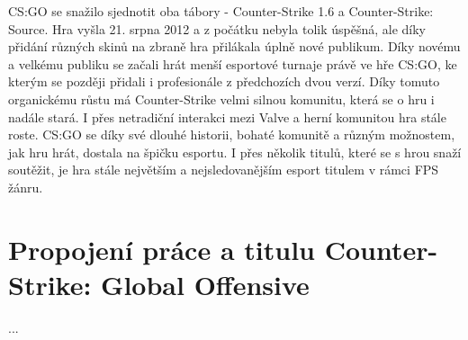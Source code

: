 \ac{CS:GO} se snažilo sjednotit oba tábory - Counter-Strike 1.6 a Counter-Strike: Source. Hra vyšla 21. srpna 2012 a z počátku nebyla tolik úspěšná, ale díky přidání různých skinů\cite{Valve2013} na zbraně hra přilákala
úplně nové publikum. Díky novému a velkému publiku se začali hrát menší esportové turnaje právě ve hře \ac{CS:GO}, ke kterým se později přidali i profesionále z předchozích dvou verzí. Díky tomuto organickému růstu má
Counter-Strike velmi silnou komunitu, která se o hru i nadále stará. I přes netradiční interakci mezi Valve a herní komunitou hra stále roste. \ac{CS:GO} se díky své dlouhé historii, bohaté komunitě a různým možnostem,
jak hru hrát, dostala na špičku esportu. I přes několik titulů, které se s hrou snaží soutěžit, je hra stále největším a nejsledovanějším esport titulem v rámci \ac{FPS} žánru\cite{Henningson2020}.

\section{Propojení práce a titulu Counter-Strike: Global Offensive}
...
